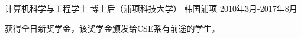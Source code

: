 

\begin{cventries}

  \cventry
    {计算机科学与工程学士} %
    {博士后（浦项科技大学）} %
    {韩国浦项} %
    {2010年3月-2017年8月} %
    {
      \begin{cvitems} %
        \item {获得全日新奖学金，该奖学金颁发给CSE系有前途的学生。}
      \end{cvitems}
    }

\end{cventries}
